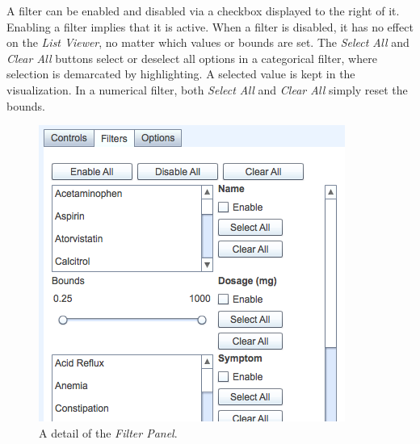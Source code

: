 \documentclass{chi2009}
\newcommand{\ListViewer}{\textit{List Viewer}}
\newcommand{\Filters}{\textit{Filter Panel}}
\begin{document}
A filter can be enabled and disabled via a checkbox displayed to the right of it. Enabling a filter implies that it is active. When a filter is disabled, it has no effect on the \ListViewer, no matter which values or bounds are set. The \textit{Select All} and \textit{Clear All} buttons select or deselect all options in a categorical filter, where selection is demarcated by highlighting. A selected value is kept in the visualization. In a numerical filter, both \textit{Select All} and \textit{Clear All} simply reset the bounds.

\begin{figure}[t]
\begin{center}
\includegraphics[width=1\linewidth]{img/filters.png}
\end{center}
   \caption{A detail of the \Filters.}
   \label{fig:filters}
\end{figure}
\end{document}
